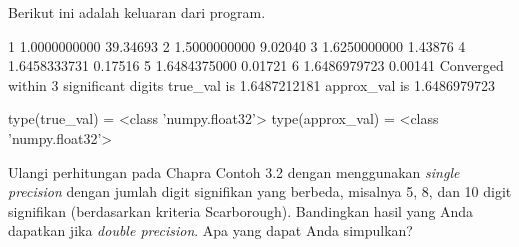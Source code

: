 Berikut ini adalah keluaran dari program.
\begin{textcode}
  1       1.0000000000   39.34693%
  2       1.5000000000    9.02040%
  3       1.6250000000    1.43876%
  4       1.6458333731    0.17516%
  5       1.6484375000    0.01721%
  6       1.6486979723    0.00141%
Converged within 3 significant digits
true_val   is       1.6487212181
approx_val is       1.6486979723

type(true_val)   =  <class 'numpy.float32'>
type(approx_val) =  <class 'numpy.float32'>
\end{textcode}

\begin{soal}
Ulangi perhitungan pada Chapra Contoh 3.2 dengan menggunakan \textit{single precision}
dengan jumlah digit signifikan yang berbeda, misalnya 5, 8, dan 10 digit signifikan
(berdasarkan kriteria Scarborough). Bandingkan hasil yang Anda dapatkan jika
\textit{double precision}. Apa yang dapat Anda simpulkan?
\end{soal}